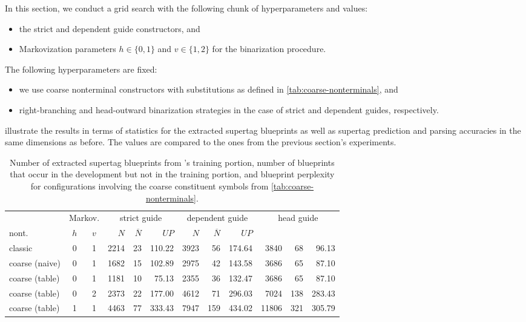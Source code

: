 \documentclass[../../document.tex]{subfiles}
\begin{document}
    In this section, we conduct a grid search with the following chunk of hyperparameters and values:
    \begin{itemize}
        \item the strict and dependent guide constructors, and
        \item Markovization parameters \(h \in \{0,1\}\) and \(v \in \{1,2\}\) for the binarization procedure.
    \end{itemize}
    The following hyperparameters are fixed:
    \begin{itemize}
        \item we use coarse nonterminal constructors with substitutions as defined in \cref{tab:coarse-nonterminals}, and
        \item right-branching and head-outward binarization strategies in the case of strict and dependent guides, respectively.
    \end{itemize}
     illustrate the results in terms of statistics for the extracted supertag blueprints as well as supertag prediction and parsing accuracies in the same dimensions as before.
    The values are compared to the ones from the previous section's experiments.

    \begin{table}
        \caption{\label{tbl:gridsearch:coarse:1}
        Number of extracted supertag blueprints from \negra{}'s training portion, number of blueprints that occur in the development but not in the training portion, and blueprint perplexity for configurations involving the coarse constituent symbols from \cref{tab:coarse-nonterminals}.
        }
        \centering
        \vspace{.2cm}
        \begin{tabular}{lcc|rrr|rrr|rrr}
            \toprule
& \multicolumn{2}{c|}{Markov.}         & \multicolumn{3}{c|}{strict guide} &  \multicolumn{3}{c|}{dependent guide} &  \multicolumn{3}{c|}{head guide} \\
nont.           & \(h\) & \(v\) & $N$ & $\overline{N}$ & $\mathit{UP}$ & $N$ & $\overline{N}$ & $\mathit{UP}$  \\ \hline \rowcolor{black!10}
classic        & 0 & 1 & 2214 & 23 & 110.22 & 3923 & 56 & 174.64 & 3840 & 68 & 96.13 \\\rowcolor{black!10}
coarse (naive) & 0 & 1 & 1682 & 15 & 102.89 & 2975 & 42 & 143.58 & 3686 & 65 & 87.10 \\\hline
coarse (table) & 0 & 1 & 1181 & 10 & 75.13 & 2355 & 36 & 132.47 & 3686 & 65 & 87.10 \\
coarse (table) & 0 & 2 & 2373 & 22 & 177.00 & 4612 & 71 & 296.03 & 7024 & 138 & 283.43 \\
coarse (table) & 1 & 1 & 4463 & 77 & 333.43 & 7947 & 159 & 434.02 & 11806 & 321 & 305.79 \\
\bottomrule
        \end{tabular}
    \end{table}
\end{document}
